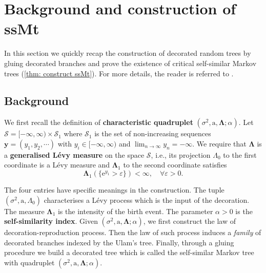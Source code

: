 \documentclass[12pt]{article}
\numberwithin{equation}{section}
\theoremstyle{plain}
\theoremstyle{definition}
\newcommand{\Bd}[1]{\boldsymbol{#1}}
\begin{document}
\tableofcontents








\section{Background and construction of ssMt}
In this section we quickly recap the construction of decorated random trees by gluing decorated branches and prove the existence of critical self-similar Markov trees (\cref{thm: construct ssMt}). For more details, the reader is referred to  \cite[Chapters 1,2]{BertoinJean2024SMta}.

\subsection{Background} \label{sec: construction of the ssMts}

We first recall the definition of \textbf{characteristic quadruplet} $(\sigma^2, \mathrm{a}, \boldsymbol{\Lambda}; \alpha)$. Let $\mathcal{S} = [-\infty, \infty)\times \mathcal{S}_1$ where $\mathcal{S}_1$ is the set of non-increasing sequences $\Bd y = (y_1, y_2, \cdots)$ with $y_i\in [-\infty, \infty)$ and $\lim_{n\to\infty} y_n = -\infty$. We require that $\Bd\Lambda$ is a \textbf{generalised L\'evy measure} on the space $\mathcal{S}$, i.e., its projection $\Lambda_0$  to the first coordinate is a L\'evy measure and $\Bd\Lambda_1$ to the second coordinate satisfies
\begin{equation}\label{eq: generalised Levy measure} \Bd\Lambda_1(\{\mathrm{e}^{y_1}>\varepsilon\})<\infty, \quad \forall \varepsilon>0.
\end{equation}

The four entries have specific meanings in the construction. The tuple $(\sigma^2, \mathrm{a}, \Lambda_0)$ characterises a L\'evy process which is the input of the decoration. The measure $\Bd\Lambda_1$ is the intensity of the birth event. The parameter $\alpha>0$ is the \textbf{self-similarity index}. Given $(\sigma^2, \mathrm{a}, \boldsymbol{\Lambda}; \alpha)$, we first construct the law of decoration-reproduction process. Then the law of such process induces a \textit{family} of decorated branches indexed by the Ulam's tree. Finally, through a gluing procedure we build a decorated tree which is called the self-similar Markov tree with quadruplet $(\sigma^2, \mathrm{a}, \boldsymbol{\Lambda}; \alpha)$.
\end{document}
